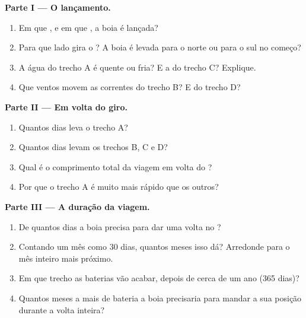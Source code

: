 \begin{problem}
\noindent\textbf{Parte I --- O lançamento.}\par\nopagebreak
\begin{enumerate}[beginpenalty=10000]
  \item Em que , e em que , a boia é lançada?
  \item Para que lado gira o ? A boia é levada para o norte ou para o
        sul no começo?
  \item A água do trecho A é quente ou fria? E a do trecho C? Explique.
  \item Que ventos movem as correntes do trecho B? E do trecho D?
\end{enumerate}

\noindent\textbf{Parte II --- Em volta do giro.}\par\nopagebreak
\begin{enumerate}[resume, beginpenalty=10000]
  \item Quantos dias leva o trecho A?
  \item Quantos dias levam os trechos B, C e D?
  \item Qual é o comprimento total da viagem em volta do ?
  \item Por que o trecho A é muito mais rápido que os outros?
\end{enumerate}

\noindent\textbf{Parte III --- A duração da viagem.}\par\nopagebreak
\begin{enumerate}[resume, beginpenalty=10000]
  \item De quantos dias a boia precisa para dar uma volta no ?
  \item Contando um mês como 30 dias, quantos meses isso dá? Arredonde para
        o mês inteiro mais próximo.
  \item Em que trecho as baterias vão acabar, depois de cerca de um ano
        (365 dias)?
  \item Quantos meses a mais de bateria a boia precisaria para mandar a
        sua posição durante a volta inteira?
\end{enumerate}
\end{problem}

